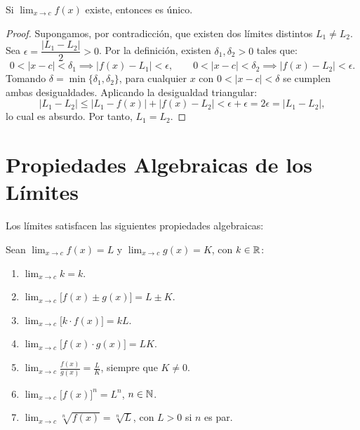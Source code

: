 \begin{theorem}
Si $\lim_{x\to c}f(x)$ existe, entonces es único.
\end{theorem}

\begin{proof}
Supongamos, por contradicción, que existen dos límites distintos $L_1 \neq L_2$.
Sea $\epsilon = \dfrac{|L_1-L_2|}{2} > 0$. Por la definición, existen
$\delta_1, \delta_2 > 0$ tales que:
\[
  0<|x-c|<\delta_1 \implies |f(x)-L_1|<\epsilon, \qquad
  0<|x-c|<\delta_2 \implies |f(x)-L_2|<\epsilon.
\]
Tomando $\delta = \min\{\delta_1, \delta_2\}$, para cualquier $x$ con
$0<|x-c|<\delta$ se cumplen ambas desigualdades. Aplicando la desigualdad
triangular:
\[
  |L_1-L_2| \leq |L_1-f(x)| + |f(x)-L_2| < \epsilon + \epsilon
             = 2\epsilon = |L_1-L_2|,
\]
lo cual es absurdo. Por tanto, $L_1 = L_2$.
\end{proof}

\section{Propiedades Algebraicas de los Límites}

Los límites satisfacen las siguientes propiedades algebraicas:

\begin{theorem}
Sean $\lim_{x\to c}f(x) = L$ y $\lim_{x\to c}g(x) = K$, con $k\in{\mathbb R}$:
\begin{enumerate}
  \item $\displaystyle\lim_{x\to c} k = k$.
  \item $\displaystyle\lim_{x\to c}\bigl[f(x)\pm g(x)\bigr] = L \pm K$.
  \item $\displaystyle\lim_{x\to c}\bigl[k\cdot f(x)\bigr] = kL$.
  \item $\displaystyle\lim_{x\to c}\bigl[f(x)\cdot g(x)\bigr] = LK$.
  \item $\displaystyle\lim_{x\to c}\frac{f(x)}{g(x)} = \frac{L}{K}$,\quad
        siempre que $K\neq 0$.
  \item $\displaystyle\lim_{x\to c}\bigl[f(x)\bigr]^n = L^n$,\quad
        $n\in{\mathbb N}$.
  \item $\displaystyle\lim_{x\to c}\sqrt[n]{f(x)} = \sqrt[n]{L}$,\quad
        con $L>0$ si $n$ es par.
\end{enumerate}
\end{theorem}

